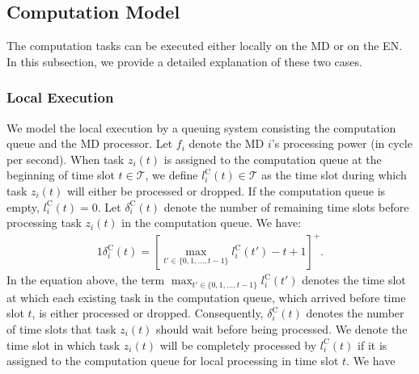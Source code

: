 \documentclass[12pt,draftclsnofoot,onecolumn]{IEEEtran}
\begin{document}
\subsection{Computation Model}
The computation tasks can be executed either locally on the MD or on the EN. In this subsection, we provide a detailed explanation of these two cases.
\subsubsection{Local Execution}
We model the local execution by a queuing system consisting the computation queue and the MD processor. Let $f_i$ denote the MD $i$'s processing power (in cycle per second). When task $z_i(t)$ is assigned to the computation queue at the beginning of time slot $t \in \mathcal{T}$, we define $l_i^{\text{C}}(t) \in \mathcal{T}$ as the time slot during which task $z_i(t)$ will either be processed or dropped. If the computation queue is empty, $l_i^{\text{C}}(t) = 0$. Let $\delta_i^{\text{C}}(t)$ denote the number of remaining time slots before processing task $z_i(t)$ in the computation queue. We have:
\begin{alignat}{1}
	\delta_i^{\text{C}}(t) = \left[ \max \limits_{t' \in \{0,1,\ldots,t-1\}} l_i^{\text{C}}(t')-t+1 \right]^+.
	\label{5}  
\end{alignat}
In the equation above, the term $\max_{t' \in \{0, 1, \ldots, t-1\}} l_i^{\text{C}}(t')$ denotes the time slot at which each existing task in the computation queue, which arrived before time slot $t$, is either processed or dropped. Consequently, $\delta_i^{\text{C}}(t)$ denotes the number of time slots that task $z_i(t)$ should wait before being processed. We denote the time slot in which task $z_i(t)$ will be completely processed by $l_i^{\text{C}}(t)$ if it is assigned to the computation queue for local processing in time slot $t$. We have
\end{document}
